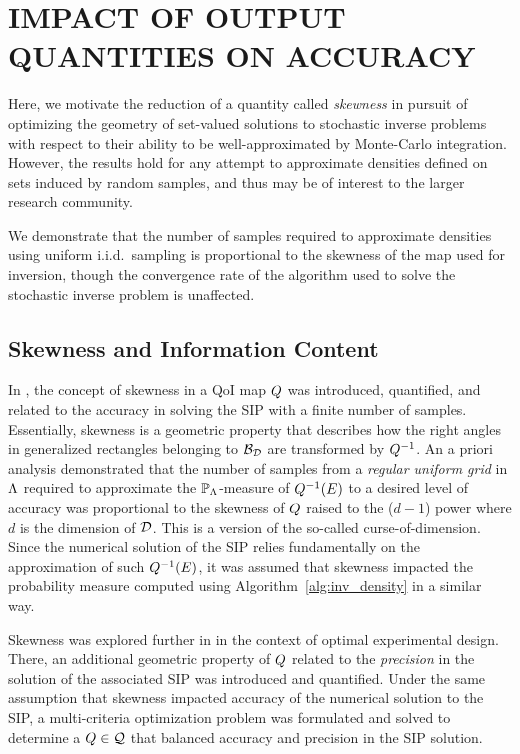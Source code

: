 \chapter{\uppercase{Impact of Output Quantities on Accuracy} \label{chapter:03}}

Here, we motivate the reduction of a quantity called \emph{skewness} in pursuit of optimizing the geometry of set-valued solutions to stochastic inverse problems with respect to their ability to be well-approximated by Monte-Carlo integration.
However, the results hold for any attempt to approximate densities defined on sets induced by random samples, and thus may be of interest to the larger research community.

We demonstrate that the number of samples required to approximate densities using uniform i.i.d.~sampling is proportional to the skewness of the map used for inversion, though the convergence rate of the algorithm used to solve the stochastic inverse problem is unaffected.


\section{Skewness and Information Content}\label{sec:skewness}
In \cite{BGE+15}, the concept of skewness in a QoI map $Q$ was introduced, quantified, and related to the accuracy in solving the SIP with a finite number of samples.
Essentially, skewness is a geometric property that describes how the right angles in generalized rectangles belonging to $\mathcal{B}_{\mathcal{D}}$ are transformed by $Q^{-1}$.
An a priori analysis demonstrated that the number of samples from a {\em regular uniform grid} in ${\Lambda}$ required to approximate the $\mathbb{P}_{\Lambda}$-measure of $Q^{-1}(E)$ to a desired level of accuracy was proportional to the skewness of $Q$ raised to the ($d-1$) power where $d$ is the dimension of $\mathcal{D}$.
This is a version of the so-called curse-of-dimension.
Since the numerical solution of the SIP relies fundamentally on the approximation of such $Q^{-1}(E)$, it was assumed that skewness impacted the probability measure computed using Algorithm~\ref{alg:inv_density} in a similar way.

Skewness was explored further in \cite{BPW17} in the context of optimal experimental design.
There, an additional geometric property of $Q$ related to the {\em precision} in the solution of the associated SIP was introduced and quantified.
Under the same assumption that skewness impacted accuracy of the numerical solution to the SIP, a multi-criteria optimization problem was formulated and solved to determine a $Q\in\mathcal{Q}$ that balanced accuracy and precision in the SIP solution.

